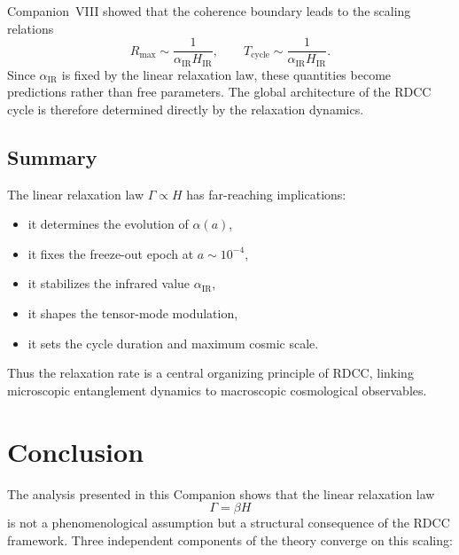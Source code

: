 \documentclass[11pt,a4paper]{article}
\begin{document}
Companion~VIII showed that the coherence boundary leads to the scaling relations
\begin{equation}
    R_{\max} \sim \frac{1}{\alpha_{\mathrm{IR}} H_{\mathrm{IR}}}, \qquad
    T_{\mathrm{cycle}} \sim \frac{1}{\alpha_{\mathrm{IR}} H_{\mathrm{IR}}}.
\end{equation}
Since $\alpha_{\mathrm{IR}}$ is fixed by the linear relaxation law, these quantities become
predictions rather than free parameters. The global architecture of the RDCC cycle is
therefore determined directly by the relaxation dynamics.

\subsection{Summary}

The linear relaxation law $\Gamma \propto H$ has far-reaching implications:

\begin{itemize}
    \item it determines the evolution of $\alpha(a)$,
    \item it fixes the freeze-out epoch at $a \sim 10^{-4}$,
    \item it stabilizes the infrared value $\alpha_{\mathrm{IR}}$,
    \item it shapes the tensor-mode modulation,
    \item it sets the cycle duration and maximum cosmic scale.
\end{itemize}

Thus the relaxation rate is a central organizing principle of RDCC, linking microscopic
entanglement dynamics to macroscopic cosmological observables.

\section{Conclusion}

The analysis presented in this Companion shows that the linear relaxation law
\begin{equation}
    \Gamma = \beta H
\end{equation}
is not a phenomenological assumption but a structural consequence of the RDCC
framework. Three independent components of the theory converge on this scaling:
\end{document}
